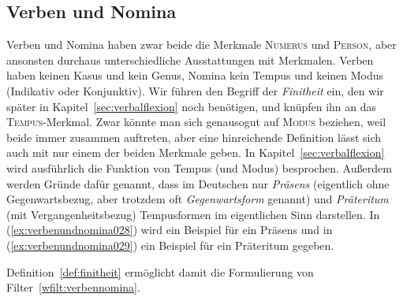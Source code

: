 

\subsection{Verben und Nomina}
\label{sec:verbenundnomina}


Verben und Nomina haben zwar beide die Merkmale \textsc{Numerus} und \textsc{Person}, aber ansonsten durchaus unterschiedliche Ausstattungen mit Merkmalen.
Verben haben keinen Kasus und kein Genus, Nomina kein Tempus und keinen Modus (Indikativ oder Konjunktiv).
Wir führen den Begriff der \textit{Finitheit} ein, den wir später in Kapitel~\ref{sec:verbalflexion} noch benötigen, und knüpfen ihn an das \textsc{Tempus}-Merkmal.
Zwar könnte man sich genausogut auf \textsc{Modus} beziehen, weil beide immer zusammen auftreten, aber eine hinreichende Definition lässt sich auch mit nur einem der beiden Merkmale geben.
In Kapitel~\ref{sec:verbalflexion} wird ausführlich die Funktion von Tempus (und Modus) besprochen.
Außerdem werden Gründe dafür genannt, dass im Deutschen nur \textit{Präsens} (eigentlich ohne Gegenwartsbezug, aber trotzdem oft \textit{Gegenwartsform} genannt) und \textit{Präteritum} (mit Vergangenheitsbezug) Tempusformen im eigentlichen Sinn darstellen.
In (\ref{ex:verbenundnomina028}) wird ein Beispiel für ein Präsens und in (\ref{ex:verbenundnomina029}) ein Beispiel für ein Präteritum gegeben.

\begin{exe}
  \ex\label{ex:verbenundnomina027}
  \begin{xlist}
  \end{xlist}
\end{exe}

Definition~\ref{def:finitheit} ermöglicht damit die Formulierung von Filter~\ref{wfilt:verbennomina}.



